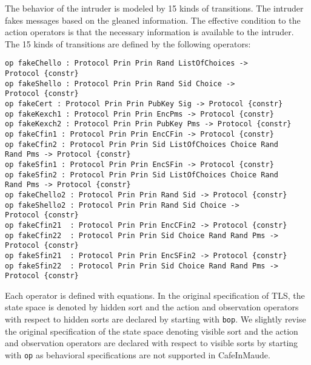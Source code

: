 \documentclass[a4paper,fleqn]{cas-dc}
\begin{document}
The behavior of the intruder is modeled by 15
kinds of transitions. The intruder fakes messages based on the gleaned information. The effective condition to the action operators is that the necessary information is available to the intruder. The 15 kinds of transitions are defined by the following operators:
\begin{small}
\begin{verbatim}
op fakeChello : Protocol Prin Prin Rand ListOfChoices ->
Protocol {constr}
op fakeShello : Protocol Prin Prin Rand Sid Choice ->
Protocol {constr}
op fakeCert : Protocol Prin Prin PubKey Sig -> Protocol {constr}
op fakeKexch1 : Protocol Prin Prin EncPms -> Protocol {constr}
op fakeKexch2 : Protocol Prin Prin PubKey Pms -> Protocol {constr}
op fakeCfin1 : Protocol Prin Prin EncCFin -> Protocol {constr}
op fakeCfin2 : Protocol Prin Prin Sid ListOfChoices Choice Rand 
Rand Pms -> Protocol {constr}
op fakeSfin1 : Protocol Prin Prin EncSFin -> Protocol {constr}
op fakeSfin2 : Protocol Prin Prin Sid ListOfChoices Choice Rand 
Rand Pms -> Protocol {constr}
op fakeChello2 : Protocol Prin Prin Rand Sid -> Protocol {constr}
op fakeShello2 : Protocol Prin Prin Rand Sid Choice ->
Protocol {constr}
op fakeCfin21  : Protocol Prin Prin EncCFin2 -> Protocol {constr}
op fakeCfin22  : Protocol Prin Prin Sid Choice Rand Rand Pms -> 
Protocol {constr}
op fakeSfin21  : Protocol Prin Prin EncSFin2 -> Protocol {constr}
op fakeSfin22  : Protocol Prin Prin Sid Choice Rand Rand Pms -> 
Protocol {constr} 
\end{verbatim}
\end{small}	
Each operator is defined with equations. In the original specification of TLS, the state space is denoted by hidden sort and the action and observation operators with respect to hidden sorts are declared by starting with \verb !bop!. 
We slightly revise the original specification of the state space denoting visible sort and the action and observation operators are declared with respect to visible sorts by starting with \verb !op! as behavioral specifications are not supported in CafeInMaude.
\end{document}
